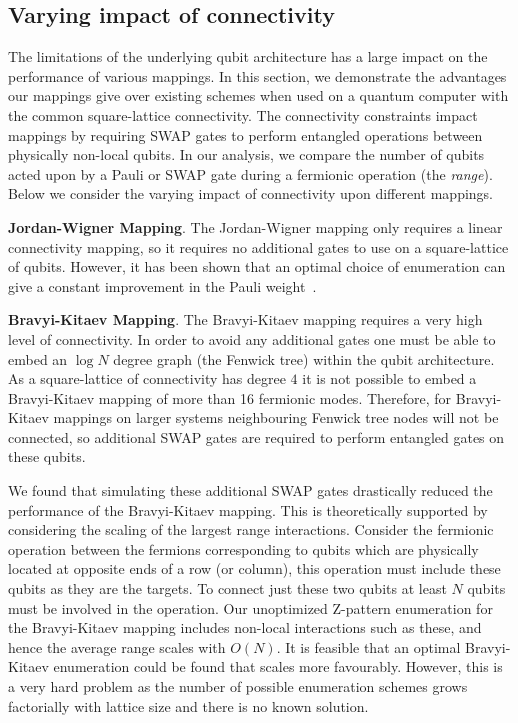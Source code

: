 \documentclass[pdftex,pra,aps,twocolumn,twoside]{revtex4-2}
\theoremstyle{plain}
\theoremstyle{note}
\newcommand\+{{\footnotesize \raisebox{0.3ex}{+}}}
\begin{document}
\subsection{Varying impact of connectivity}
\label{section:connectivity}
The limitations of the underlying qubit architecture has a large impact on the performance of various mappings. In this section, we demonstrate the advantages our mappings give over existing schemes when used on a quantum computer with the common square-lattice connectivity. The connectivity constraints impact mappings by requiring SWAP gates to perform entangled operations between physically non-local qubits. In our analysis, we compare the number of qubits acted upon by a Pauli or SWAP gate during a fermionic operation (the \textit{range}). Below we consider the varying impact of connectivity upon different mappings.

\textbf {Jordan-Wigner Mapping}. The Jordan-Wigner mapping only requires a linear connectivity mapping, so it requires no additional gates to use on a square-lattice of qubits. However, it has been shown that an optimal choice of enumeration can give a constant improvement in the Pauli weight~\cite{chiew2021optimal}.

\textbf {Bravyi-Kitaev Mapping}.
The Bravyi-Kitaev mapping requires a very high level of connectivity. In order to avoid any additional gates one must be able to embed an $\log N$ degree graph (the Fenwick tree) within the qubit architecture. As a square-lattice of connectivity has degree $4$ it is not possible to embed a Bravyi-Kitaev mapping of more than 16 fermionic modes. Therefore, for Bravyi-Kitaev mappings on larger systems neighbouring Fenwick tree nodes will not be connected, so additional SWAP gates are required to perform entangled gates on these qubits.

We found that simulating these additional SWAP gates drastically reduced the performance of the Bravyi-Kitaev mapping. This is theoretically supported by considering the scaling of the largest range interactions. Consider the fermionic operation between the fermions corresponding to qubits which are physically located at opposite ends of a row (or column), this operation must include these qubits as they are the targets. To connect just these two qubits at least $N$ qubits must be involved in the operation. Our unoptimized Z-pattern enumeration for the Bravyi-Kitaev mapping includes non-local interactions such as these, and hence the average range scales with $O(N)$. It is feasible that an optimal Bravyi-Kitaev enumeration could be found that scales more favourably. However, this is a very hard problem as the number of possible enumeration schemes grows factorially with lattice size and there is no known solution.
\end{document}
